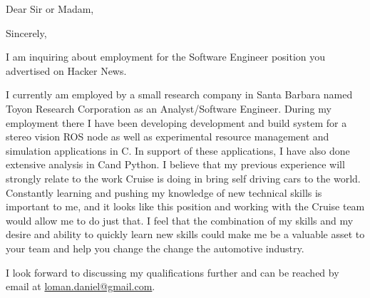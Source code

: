 \documentclass[11pt,letterpaper,sans]{moderncv}        %
\newcommand\cpp{C\raisebox{0.5ex}{\tiny\textbf{++}}}
\begin{document}
\date{July 12, 2014}
\opening{Dear Sir or Madam,}
\closing{Sincerely,}
\makelettertitle

I am inquiring about employment for the Software Engineer position you advertised on Hacker News.

I currently am employed by a small research company in Santa Barbara
named Toyon Research Corporation as an Analyst/Software Engineer.
During my employment there I have been developing development and build system for a stereo vision ROS node as well as experimental resource management and simulation applications in \cpp.
In support of these applications, I have also done extensive analysis in \cpp \space and Python.
I believe that my previous experience will strongly relate to the work Cruise is doing in bring self driving cars to the world.
Constantly learning and pushing my knowledge of new technical skills is important to me,
and it looks like this position and working with the Cruise team would allow me to do just that.
I feel that the combination of my skills and my desire and ability to quickly learn new skills
could make me be a valuable asset to your team and help you change the change the automotive industry.

I look forward to discussing my qualifications further and can be reached by email at
\href{loman.daniel@gmail.com}{\textcolor{color2}{loman.daniel@gmail.com}}.

\makeletterclosing
\end{document}
